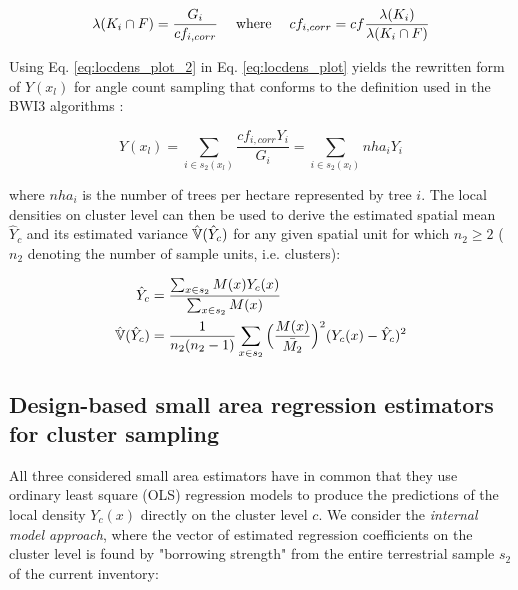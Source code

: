 \begin{equation}\label{eq:locdens_plot_3}
\lambda(K_i \cap F) = \frac{G_i}{cf_{i, corr}} \hspace{3ex} \text{where} \hspace{3ex} cf_{i,corr} = cf\frac{\lambda(K_i)}{\lambda(K_i \cap F)}
\end{equation}

Using Eq. \ref{eq:locdens_plot_2} in Eq. \ref{eq:locdens_plot} yields the rewritten form of $Y(x_l)$ for angle count sampling that conforms to the definition used in the BWI3 algorithms \citep{bwi3_ausw}:

\begin{equation}\label{eq:locdens_plot_4}
Y(x_l)= \sum_{i \in s_{2}(x_l)} \frac{cf_{i, corr}Y_i}{G_i} = \sum_{i \in s_{2}(x_l)} nha_{i}{Y_i}
\end{equation}

where $nha_i$ is the number of trees per hectare represented by tree $i$. The local densities on cluster level can then be used to derive the estimated spatial mean $\hat{Y}_c$ and its estimated variance $\hat{\mathbb{V}}(\hat{Y}_c)$ for any given spatial unit for which $n_2 \geq 2$ ($n_2$ denoting the number of sample units, i.e. clusters):

\begin{subequations}\label{eq:srs_est_cluster}
	\begin{align}
	\hat{Y}_c &= \frac{\sum_{x \in s_2} M(x) Y_{c}(x)}{\sum_{x \in s_2} M(x)} \\
	\hat{\mathbb{V}}(\hat{Y}_c) &= \frac{1}{n_2(n_2 - 1)}\sum_{x \in s_2}\Big(\frac{M(x)}{\bar{M_2}}\Big)^2(Y_{c}(x) - \hat{Y}_c)^2
	\end{align}
\end{subequations}


\subsection{Design-based small area regression estimators for cluster sampling}
\label{sec:SAestimators}

All three considered small area estimators have in common that they use ordinary least square (OLS) regression models to produce the predictions of the local density $Y_{c}(x)$ directly on the cluster level $c$. We consider the \textit{internal model approach}, where the vector of estimated regression coefficients on the cluster level is found by "borrowing strength" from the entire terrestrial sample $s_2$ of the current inventory:

